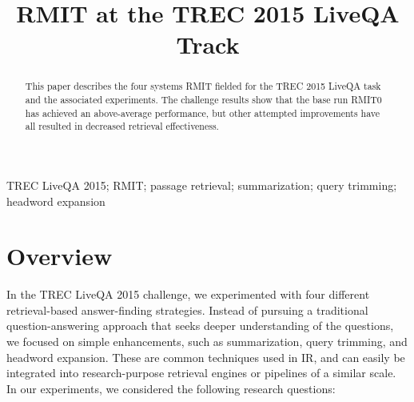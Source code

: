 \documentclass[a4paper,10pt,conference,compsocconf,final]{IEEEtran}
\newcommand{\opstyle}[1]{\mbox{\textsc{#1}}}
\begin{document}

\title{RMIT at the TREC 2015 LiveQA Track}
\author{
}

\maketitle

\begin{abstract} This paper describes the four systems RMIT fielded
for the {\opstyle{TREC}} 2015 LiveQA task and the associated
experiments.
The challenge results show that the base run RMIT0 has achieved an
above-average performance, but other attempted improvements have all
resulted in decreased retrieval effectiveness.
\end{abstract}

\begin{IEEEkeywords} 
  \opstyle{TREC} LiveQA 2015; RMIT; passage retrieval; summarization; query trimming; headword expansion
\end{IEEEkeywords}

\section{Overview}
\label{overview}
In the TREC LiveQA 2015 challenge, we experimented with four
different retrieval-based answer-finding strategies.
Instead of pursuing a traditional question-answering approach that
seeks deeper understanding of the questions, we focused on simple
enhancements, such as summarization, query trimming, and headword
expansion.
These are common techniques used in IR, and can easily be
integrated into research-purpose retrieval engines or pipelines of
a similar scale.
In our experiments, we considered the following research questions: 
\end{document}
